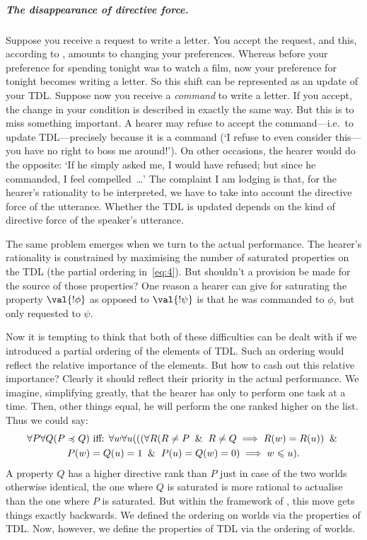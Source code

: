 \subparagraph{The disappearance of directive force.}
Suppose you receive a request to write a letter. You accept the request, and this, according to \Th, amounts to changing your preferences. Whereas before your preference for spending tonight was to watch a film, now your preference for tonight becomes writing a letter. So this shift can be represented as an update of your TDL. Suppose now you receive a \emph{command} to write a letter. If you accept, the change in your condition is described in exactly the same way. But this is to miss something important. A hearer may refuse to accept the command---i.e.\ to update TDL---precisely because it is a command (`I refuse to even consider this---you have no right to boss me around!'). On other occasions, the hearer would do the opposite: `If he simply asked me, I would have refused; but since he commanded, I feel compelled~\dots' The complaint I am lodging is that, for the hearer's rationality to be interpreted, we have to take into account the directive force of the utterance. Whether the TDL is updated depends on the kind of directive force of the speaker's utterance. 

The same problem emerges when we turn to the actual performance. The hearer's rationality is constrained by maximising the number of saturated properties on the TDL (the partial ordering in~\eqref{eq:4}). But shouldn't a provision be made for the source of those properties? One reason a hearer can give for saturating the property $\val{!\phi}$ as opposed to $\val{!\psi}$ is that he was commanded to $\phi$, but only requested to $\psi$. %

Now it is tempting to think that both of these difficulties can be dealt with if we introduced a partial ordering of the elements of TDL. Such an ordering would reflect the relative importance of the elements. But how to cash out this relative importance? Clearly it should reflect their priority in the actual performance. We imagine, simplifying greatly, that the hearer has only to perform one task at a time. Then, other things equal, he will perform the one ranked higher on the list. Thus we could say:
\begin{multline}
  \label{eq:5}
  \forall P \forall Q ( P \preccurlyeq Q) \text{ iff: } \forall w \forall u (((\forall R (R \neq P \And R \neq Q \implies R(w) = R(u)) \And\\ P(w) = Q(u) = 1 \And P(u) = Q(w) = 0) \implies w \leqslant u).
\end{multline}
A property $Q$ has a higher directive rank than $P$ just in case of the two worlds otherwise identical, the one where $Q$ is saturated is more rational to actualise than the one where $P$ is saturated. But within the framework of \Th, this move gets things exactly backwards. We defined the ordering on worlds via the properties of TDL. Now, however, we define the properties of TDL via the ordering of worlds.

